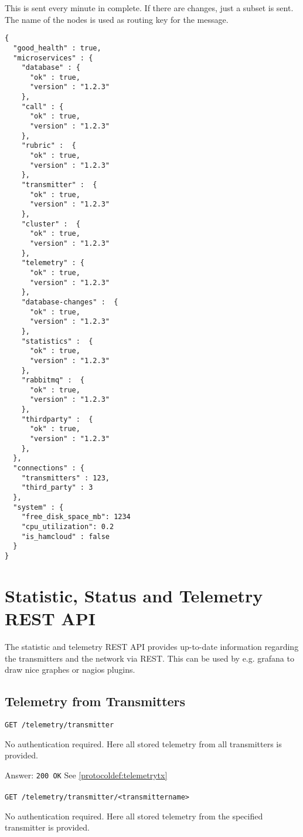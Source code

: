 This is sent every minute in complete. If there are changes, just a subset is sent.
The name of the nodes is used as routing key for the message.
\begin{lstlisting}
{
  "good_health" : true,
  "microservices" : {
    "database" : {
      "ok" : true,
      "version" : "1.2.3"
    },
    "call" : {
      "ok" : true,
      "version" : "1.2.3"
    },
    "rubric" :  {
      "ok" : true,
      "version" : "1.2.3"
    },
    "transmitter" :  {
      "ok" : true,
      "version" : "1.2.3"
    },
    "cluster" :  {
      "ok" : true,
      "version" : "1.2.3"
    },
    "telemetry" : {
      "ok" : true,
      "version" : "1.2.3"
    },
    "database-changes" :  {
      "ok" : true,
      "version" : "1.2.3"
    },
    "statistics" :  {
      "ok" : true,
      "version" : "1.2.3"
    },
    "rabbitmq" :  {
      "ok" : true,
      "version" : "1.2.3"
    },
    "thirdparty" :  {
      "ok" : true,
      "version" : "1.2.3"
    },
  },
  "connections" : {
    "transmitters" : 123,
    "third_party" : 3
  },
  "system" : {
    "free_disk_space_mb": 1234
    "cpu_utilization": 0.2
    "is_hamcloud" : false
  }
}
\end{lstlisting}

\section{Statistic, Status and Telemetry REST API}
The statistic and telemetry REST API provides up-to-date information regarding the transmitters and the network via REST. This can be used by e.g. grafana to draw nice graphes or nagios plugins.





\subsection{Telemetry from Transmitters}

\texttt{GET /telemetry/transmitter}

No authentication required. Here all stored telemetry from all transmitters is provided.

Answer:
\texttt{200 OK}
See \ref{protocoldef:telemetrytx}\\\\

\texttt{GET /telemetry/transmitter/<transmittername>}

No authentication required. Here all stored telemetry from the specified transmitter is provided.

